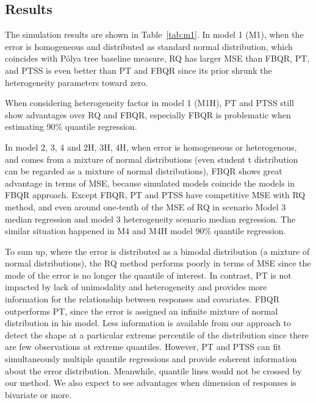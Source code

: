 \documentclass[12pt]{article}
\newcommand{\polya}{P\'{o}lya}
\begin{document}
\subsection{Results}
The simulation results are shown in Table~\ref{tab:m1}.  In model 1
(M1), when the error is homogeneous and distributed as standard normal
distribution, which coincides with \polya{} tree baseline measure, RQ
has larger MSE than FBQR, PT, and PTSS is even better than PT and FBQR
since its prior shrunk the heterogeneity parameters toward zero.

When considering heterogeneity factor in model 1 (M1H), PT and PTSS
still show advantages over RQ and FBQR, especially FBQR is problematic
when estimating 90\% quantile regression.

In model 2, 3, 4 and 2H, 3H, 4H, when error is homogeneous or
heterogenous, and comes from a mixture of normal distributions (even
student t distribution can be regarded as a mixture of normal
distributions), FBQR shows great advantage in terms of MSE, because
simulated models coincide the models in FBQR approach. Except FBQR, PT
and PTSS have competitive MSE with RQ method, and even around
one-tenth of the MSE of RQ in scenario Model 3 median regression and
model 3 heterogeneity scenario median regression. The similar
situation happened in M4 and M4H model 90\% quantile regression.

To sum up, where the error is distributed as a bimodal distribution (a
mixture of normal distributions), the RQ method performs poorly in
terms of MSE since the mode of the error is no longer the quantile of
interest. In contrast, PT is not impacted by lack of unimodality and
heterogeneity and provides more information for the relationship
between responses and covariates. FBQR outperforms PT, since the error
is assigned an infinite mixture of normal distribution in his
model. Less information is available from our approach to detect the
shape at a particular extreme percentile of the distribution since
there are few observations at extreme quantiles. However, PT and PTSS
can fit simultaneously multiple quantile regressions and provide
coherent information about the error distribution. Meanwhile, quantile
lines would not be crossed by our method.  We also expect to see
advantages when dimension of responses is bivariate or more.
\end{document}
